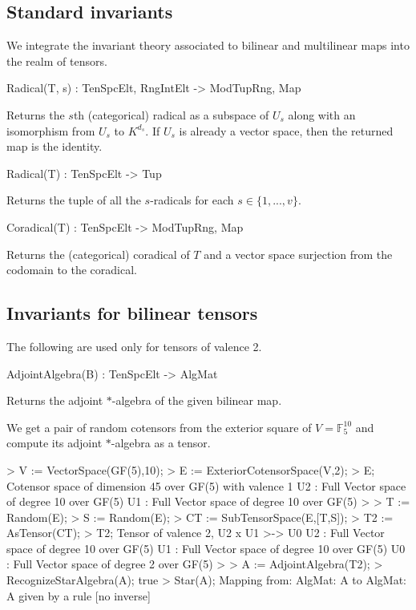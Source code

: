 \subsection{Standard invariants}

We integrate the invariant theory associated to bilinear and multilinear maps
into the realm of tensors. 

\begin{intrinsics}
Radical(T, s) : TenSpcElt, RngIntElt -> ModTupRng, Map
\end{intrinsics}

Returns the $s$th (categorical) radical as a subspace of $U_s$ along with an isomorphism from $U_s$ to $K^{d_s}$.
If $U_s$ is already a vector space, then the returned map is the identity.

\begin{intrinsics}
Radical(T) : TenSpcElt -> Tup
\end{intrinsics}

Returns the tuple of all the $s$-radicals for each $s\in \{1,...,v\}$.

\begin{intrinsics}
Coradical(T) : TenSpcElt -> ModTupRng, Map
\end{intrinsics}

Returns the (categorical) coradical of $T$ and a vector space surjection from 
the codomain to the coradical.

\subsection{Invariants for bilinear tensors}

The following are used only for tensors of valence 2.

\begin{intrinsics}
AdjointAlgebra(B) : TenSpcElt -> AlgMat
\end{intrinsics}

Returns the adjoint $*$-algebra of the given bilinear map. 

\begin{example}
We get a pair of random cotensors from the exterior square of $V=\mathbb{F}_5^{10}$ and compute its adjoint $*$-algebra as a tensor.

\begin{code}
> V := VectorSpace(GF(5),10);
> E := ExteriorCotensorSpace(V,2);
> E;
Cotensor space of dimension 45 over GF(5) with valence 1
U2 : Full Vector space of degree 10 over GF(5)
U1 : Full Vector space of degree 10 over GF(5)
> 
> T := Random(E);
> S := Random(E);
> CT := SubTensorSpace(E,[T,S]);
> T2 := AsTensor(CT);
> T2;
Tensor of valence 2, U2 x U1 >-> U0
U2 : Full Vector space of degree 10 over GF(5)
U1 : Full Vector space of degree 10 over GF(5)
U0 : Full Vector space of degree 2 over GF(5)
> 
> A := AdjointAlgebra(T2);
> RecognizeStarAlgebra(A);
true
> Star(A);
Mapping from: AlgMat: A to AlgMat: A given by a rule [no 
inverse]
\end{code}
\end{example}

